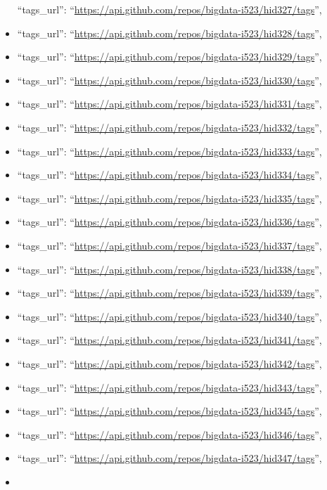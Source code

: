 \begin{itemize}
  ``tags\_url'':
  ``\url{https://api.github.com/repos/bigdata-i523/hid327/tags}'',
\item
  ``tags\_url'':
  ``\url{https://api.github.com/repos/bigdata-i523/hid328/tags}'',
\item
  ``tags\_url'':
  ``\url{https://api.github.com/repos/bigdata-i523/hid329/tags}'',
\item
  ``tags\_url'':
  ``\url{https://api.github.com/repos/bigdata-i523/hid330/tags}'',
\item
  ``tags\_url'':
  ``\url{https://api.github.com/repos/bigdata-i523/hid331/tags}'',
\item
  ``tags\_url'':
  ``\url{https://api.github.com/repos/bigdata-i523/hid332/tags}'',
\item
  ``tags\_url'':
  ``\url{https://api.github.com/repos/bigdata-i523/hid333/tags}'',
\item
  ``tags\_url'':
  ``\url{https://api.github.com/repos/bigdata-i523/hid334/tags}'',
\item
  ``tags\_url'':
  ``\url{https://api.github.com/repos/bigdata-i523/hid335/tags}'',
\item
  ``tags\_url'':
  ``\url{https://api.github.com/repos/bigdata-i523/hid336/tags}'',
\item
  ``tags\_url'':
  ``\url{https://api.github.com/repos/bigdata-i523/hid337/tags}'',
\item
  ``tags\_url'':
  ``\url{https://api.github.com/repos/bigdata-i523/hid338/tags}'',
\item
  ``tags\_url'':
  ``\url{https://api.github.com/repos/bigdata-i523/hid339/tags}'',
\item
  ``tags\_url'':
  ``\url{https://api.github.com/repos/bigdata-i523/hid340/tags}'',
\item
  ``tags\_url'':
  ``\url{https://api.github.com/repos/bigdata-i523/hid341/tags}'',
\item
  ``tags\_url'':
  ``\url{https://api.github.com/repos/bigdata-i523/hid342/tags}'',
\item
  ``tags\_url'':
  ``\url{https://api.github.com/repos/bigdata-i523/hid343/tags}'',
\item
  ``tags\_url'':
  ``\url{https://api.github.com/repos/bigdata-i523/hid345/tags}'',
\item
  ``tags\_url'':
  ``\url{https://api.github.com/repos/bigdata-i523/hid346/tags}'',
\item
  ``tags\_url'':
  ``\url{https://api.github.com/repos/bigdata-i523/hid347/tags}'',
\item

\end{itemize}
